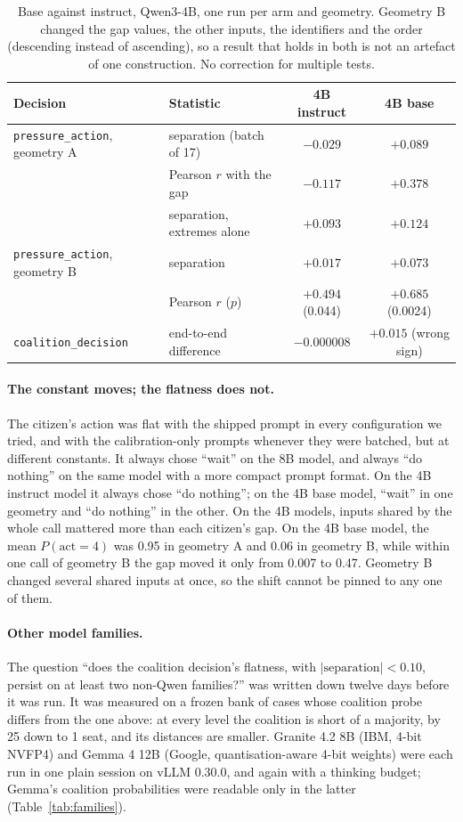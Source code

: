 \documentclass[11pt]{article}
\newcommand{\code}[1]{\texttt{#1}}
\begin{document}
\begin{table}[t]
\centering\small
\begin{tabular}{@{}llcc@{}}
\toprule
Decision & Statistic & 4B instruct & 4B base \\
\midrule
\code{pressure\_action}, geometry A & separation (batch of 17) & $-0.029$ & $+0.089$ \\
 & Pearson $r$ with the gap & $-0.117$ & $+0.378$ \\
 & separation, extremes alone & $+0.093$ & $+0.124$ \\
\code{pressure\_action}, geometry B & separation & $+0.017$ & $+0.073$ \\
 & Pearson $r$ ($p$) & $+0.494$ (0.044) & $+0.685$ (0.0024) \\
\code{coalition\_decision} & end-to-end difference & $-0.000008$ & $+0.015$ (wrong sign) \\
\bottomrule
\end{tabular}
\caption{Base against instruct, Qwen3-4B, one run per arm and geometry. Geometry B changed the gap values,
the other inputs, the identifiers and the order (descending instead of ascending), so a result
that holds in both is not an artefact of one construction. No correction for multiple tests.}
\label{tab:basevsinstruct}
\end{table}

\paragraph{The constant moves; the flatness does not.} The citizen's action was flat with the shipped prompt
in every configuration we tried, and with the calibration-only prompts whenever they were
batched, but at different constants. It always chose ``wait'' on the 8B model, and always ``do nothing'' on the same model
with a more compact prompt format. On the 4B instruct model it always chose ``do nothing''; on the
4B base model, ``wait'' in one geometry and ``do nothing'' in the other. On the 4B models,
inputs shared by the whole call mattered more than each citizen's gap. On the 4B base model, the mean
$P(\text{act}=4)$ was 0.95 in geometry A and 0.06 in geometry B, while within one call of
geometry B the gap moved it only from 0.007 to 0.47. Geometry B changed several shared inputs
at once, so the shift cannot be pinned to any one of them.

\paragraph{Other model families.} The question ``does the coalition decision's flatness, with
$|\text{separation}| < 0.10$, persist on at least two non-Qwen families?'' was written down
twelve days before it was run. It was measured on a frozen bank of cases whose coalition
probe differs from the one above: at every level the coalition is short of a majority, by 25
down to 1 seat, and its distances are smaller. Granite 4.2 8B (IBM, 4-bit NVFP4) and Gemma 4
12B (Google, quantisation-aware 4-bit weights) were each run in one plain session on vLLM 0.30.0,
and again with a thinking budget; Gemma's coalition probabilities were readable only in the
latter (Table~\ref{tab:families}).
\end{document}

